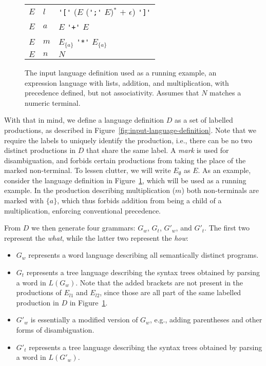 \documentclass[acmsmall,review,anonymous]{acmart}\settopmatter{printfolios=true,printccs=false,printacmref=false}
\begin{document}
\begin{figure}
  \begin{tabular}{@{}l@{\quad$->$\quad}l@{ $:$\quad}l@{}}
    $E$ & $l$ & \verb|'['| ($E$ (\verb|';'| $E$)$^{*}$ $+$ $\epsilon$) \verb|']'| \\
    $E$ & $a$ & $E$ \verb|'+'| $E$ \\
    $E$ & $m$ & $E_{\{a\}}$ \verb|'*'| $E_{\{a\}}$ \\
    $E$ & $n$ & $N$ \\
  \end{tabular}
  \caption{The input language definition used as a running example, an expression language with lists, addition, and multiplication, with precedence defined, but not associativity. Assumes that $N$ matches a numeric terminal.}
  \label{fig:running-example-definition}
\end{figure}

With that in mind, we define a language definition $D$ as a set of labelled productions, as described in Figure~\ref{fig:input-language-definition}. Note that we require the labels to uniquely identify the production, i.e., there can be no two distinct productions in $D$ that share the same label. A \emph{mark} is used for disambiguation, and forbids certain productions from taking the place of the marked non-terminal. To lessen clutter, we will write $E_\emptyset$ as $E$. As an example, consider the language definition in Figure~\ref{fig:running-example-definition}, which will be used as a running example. In the production describing multiplication ($m$) both non-terminals are marked with $\{a\}$, which thus forbids addition from being a child of a multiplication, enforcing conventional precedence.

From $D$ we then generate four grammars: $G_w$, $G_t$, $G'_w$, and $G'_t$. The first two represent the \emph{what}, while the latter two represent the \emph{how}:

\begin{itemize}
\item $G_w$ represents a word language describing all semantically distinct programs.
\item $G_t$ represents a tree language describing the syntax trees obtained by parsing a word in $L(G_w)$. Note that the added brackets are not present in the productions of $E_{l1}$ and $E_{l2}$, since those are all part of the same labelled production in $D$ in Figure~\ref{fig:running-example-definition}.
\item $G'_w$ is essentially a modified version of $G_w$, e.g., adding parentheses and other forms of disambiguation.
\item $G'_t$ represents a tree language describing the syntax trees obtained by parsing a word in $L(G'_w)$.
\end{itemize}
\end{document}
